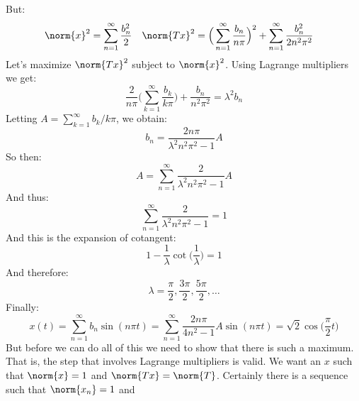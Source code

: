         But:
        \begin{align*}
            \norm{x}^{2}&=\sum_{n=1}^{\infty}\frac{b_{n}^{2}}{2}
            &
            \norm{Tx}^{2}&=
            \Big(\sum_{n=1}^{\infty}\frac{b_{n}}{n\pi}\Big)^{2}
            +\sum_{n=1}^{\infty}\frac{b_{n}^{2}}{2n^{2}\pi^{2}}
        \end{align*}
        Let's maximize $\norm{Tx}^{2}$ subject to
        $\norm{x}^{2}$. Using Lagrange multipliers we get:
        \begin{equation*}
            \frac{2}{n\pi}\Big(\sum_{k=1}^{\infty}
            \frac{b_{k}}{k\pi}\Big)
            +\frac{b_{n}}{n^{2}\pi^{2}}
            =\lambda^{2}b_{n}
        \end{equation*}
        Letting $A=\sum_{k=1}^{\infty}b_{k}/k\pi$, we obtain:
        \begin{equation*}
            b_{n}=\frac{2n\pi}{\lambda^{2}n^{2}\pi^{2}-1}A
        \end{equation*}
        So then:
        \begin{equation*}
            A=\sum_{n=1}^{\infty}
            \frac{2}{\lambda^{2}n^{2}\pi^{2}-1}A
        \end{equation*}
        And thus:
        \begin{equation*}
            \sum_{n=1}^{\infty}
            \frac{2}{\lambda^{2}n^{2}\pi^{2}-1}=1
        \end{equation*}
        And this is the expansion of cotangent:
        \begin{equation*}
            1-\frac{1}{\lambda}\cot\big(\frac{1}{\lambda}\big)
            =1
        \end{equation*}
        And therefore:
        \begin{equation*}
            \lambda=\frac{\pi}{2},\frac{3\pi}{2},\frac{5\pi}{2},
            \hdots
        \end{equation*}
        Finally:
        \begin{equation*}
            x(t)=\sum_{n=1}^{\infty}
            b_{n}\sin(n\pi{t})=
            \sum_{n=1}^{\infty}
            \frac{2n\pi}{4n^{2}-1}A\sin(n\pi{t})
            =\sqrt{2}\cos\big(\frac{\pi}{2}t\big)
        \end{equation*}
        But before we can do all of this we need to show
        that there is such a maximum. That is, the step that
        involves Lagrange multipliers is valid. We want
        an $x$ such that $\norm{x}=1$ and
        $\norm{Tx}=\norm{T}$. Certainly there is a sequence
        such that $\norm{x_{n}}=1$ and

